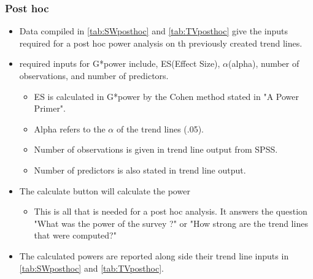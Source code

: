 \subsubsection{Post hoc}
\begin{itemize}
	\item Data compiled in \autoref{tab:SWposthoc} and \autoref{tab:TVposthoc} give the inputs required for a post hoc power analysis on th previously created trend lines.
	\item required inputs for G*power include, ES(Effect Size), $\alpha$(alpha), number of observations, and number of predictors.
	\begin{itemize}
		\item ES is calculated in G*power by the Cohen method stated in \citep{cohen1992power} "A Power Primer".
		\item Alpha refers to the $\alpha$ of the trend lines (.05).
		\item Number of observations is given in trend line output from SPSS.
		\item Number of predictors is also stated in trend line output.
	\end{itemize}
	\item The calculate button will calculate the power
	\begin{itemize}
		\item This is all that is needed for a post hoc analysis.  It answers the question "What was the power of the survey ?" or "How strong are the trend lines that were computed?"
	\end{itemize}
	\item The calculated powers are reported along side their trend line inputs in \autoref{tab:SWposthoc} and \autoref{tab:TVposthoc}.
\end{itemize}
